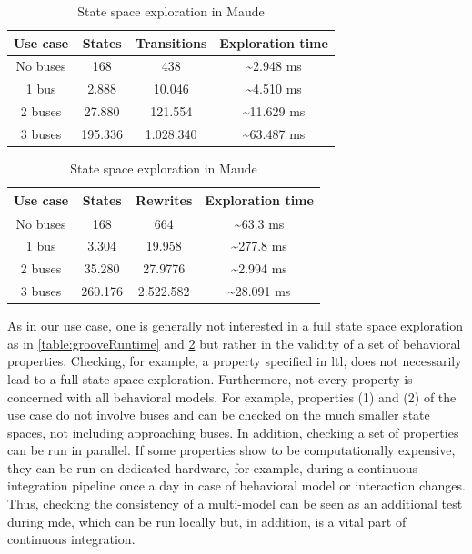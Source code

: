 \documentclass{jot}
\begin{document}
\begin{table}
\centering

\begin{tabular}{|c || c | c | c |}
 \hline
 Use case & States & Transitions & Exploration time \\
 \hline\hline
 No buses & 168 & 438 & \textasciitilde 2.948 ms \\
 \hline
 1 bus & 2.888 & 10.046 & \textasciitilde 4.510 ms \\
 \hline
 2 buses & 27.880 & 121.554 & \textasciitilde 11.629 ms \\
 \hline
 3 buses & 195.336 & 1.028.340 & \textasciitilde 63.487 ms \\
 \hline
\end{tabular}
\caption[State space exploration in Groove]{State space exploration in Groove}
\label{table:grooveRuntime}

\bigskip

\begin{tabular}{|c || c | c | c |}
 \hline
 Use case & States & Rewrites & Exploration time \\
 \hline\hline
 No buses & 168 & 664 & \textasciitilde 63.3 ms \\
 \hline
 1 bus & 3.304 & 19.958 & \textasciitilde 277.8 ms \\
 \hline
 2 buses & 35.280 & 27.9776 & \textasciitilde 2.994 ms \\
 \hline
 3 buses & 260.176 & 2.522.582 & \textasciitilde 28.091 ms \\
 \hline
\end{tabular}
\caption[State space exploration in Maude]{State space exploration in Maude}
\label{table:maudeRuntime}

\end{table}

As in our use case, one is generally not interested in a full state space exploration as in \cref{table:grooveRuntime} and \cref{table:maudeRuntime} but rather in the validity of a set of behavioral properties.
Checking, for example, a property specified in \gls*{ltl}, does not necessarily lead to a full state space exploration.
Furthermore, not every property is concerned with all behavioral models.
For example, properties (1) and (2) of the use case do not involve buses and can be checked on the much smaller state spaces, not including approaching buses.
In addition, checking a set of properties can be run in parallel.
If some properties show to be computationally expensive, they can be run on dedicated hardware, for example, during a continuous integration pipeline once a day in case of behavioral model or interaction changes.
Thus, checking the consistency of a multi-model can be seen as an additional test during \gls*{mde}, which can be run locally but, in addition, is a vital part of continuous integration.
\end{document}
